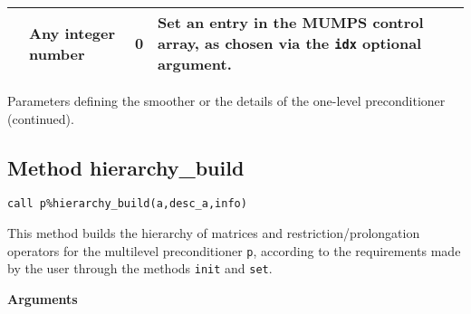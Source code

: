 \begin{center}
\begin{tabular}{|p{3cm}|l|p{2.5cm}|p{2.2cm}|p{7.1cm}|}
                         & Any integer  number
                         & 0
                         & Set an entry in the MUMPS control array, as
                           chosen via the \verb|idx| optional argument. \\ %
\hline
\end{tabular}
\end{center}
\caption{Parameters defining the smoother or the details of the one-level preconditioner
(continued).\label{tab:p_smoother_1}}  
\esideways


\clearpage

\subsection{Method hierarchy\_build\label{sec:hier_bld}}
  
\begin{center}
\verb|call p%hierarchy_build(a,desc_a,info)|\\
\end{center}

\noindent
This method builds the hierarchy of matrices and restriction/prolongation
operators for the multilevel preconditioner \verb|p|, according to the requirements
made by the user through the methods \verb|init| and \verb|set|.

{\baselineskip\noindent\large\bfseries Arguments} \smallskip


